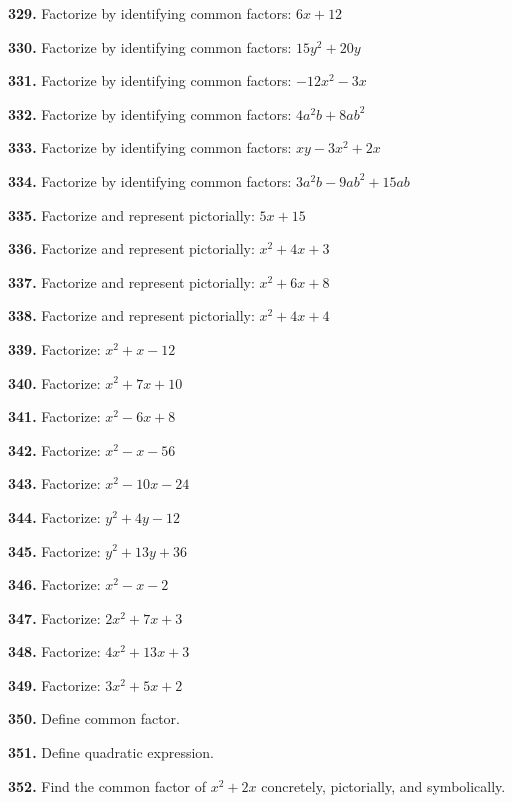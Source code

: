\documentclass[11pt]{article}
\begin{document}
\bigskip
\noindent\textbf{329.} Factorize by identifying common factors: $6x+12$

\bigskip
\noindent\textbf{330.} Factorize by identifying common factors: $15y^2+20y$

\bigskip
\noindent\textbf{331.} Factorize by identifying common factors: $-12x^2-3x$

\bigskip
\noindent\textbf{332.} Factorize by identifying common factors: $4a^2b+8ab^2$

\bigskip
\noindent\textbf{333.} Factorize by identifying common factors: $xy-3x^2+2x$

\bigskip
\noindent\textbf{334.} Factorize by identifying common factors: $3a^2b-9ab^2+15ab$

\bigskip
\noindent\textbf{335.} Factorize and represent pictorially: $5x+15$

\bigskip
\noindent\textbf{336.} Factorize and represent pictorially: $x^2+4x+3$

\bigskip
\noindent\textbf{337.} Factorize and represent pictorially: $x^2+6x+8$

\bigskip
\noindent\textbf{338.} Factorize and represent pictorially: $x^2+4x+4$

\bigskip
\noindent\textbf{339.} Factorize: $x^2+x-12$

\bigskip
\noindent\textbf{340.} Factorize: $x^2+7x+10$

\bigskip
\noindent\textbf{341.} Factorize: $x^2-6x+8$

\bigskip
\noindent\textbf{342.} Factorize: $x^2-x-56$

\bigskip
\noindent\textbf{343.} Factorize: $x^2-10x-24$

\bigskip
\noindent\textbf{344.} Factorize: $y^2+4y-12$

\bigskip
\noindent\textbf{345.} Factorize: $y^2+13y+36$

\bigskip
\noindent\textbf{346.} Factorize: $x^2-x-2$

\bigskip
\noindent\textbf{347.} Factorize: $2x^2+7x+3$

\bigskip
\noindent\textbf{348.} Factorize: $4x^2+13x+3$

\bigskip
\noindent\textbf{349.} Factorize: $3x^2+5x+2$

\bigskip
\noindent\textbf{350.} Define common factor.

\bigskip
\noindent\textbf{351.} Define quadratic expression.

\bigskip
\noindent\textbf{352.} Find the common factor of $x^2+2x$ concretely, pictorially, and symbolically.
\end{document}
